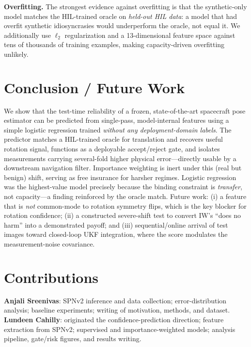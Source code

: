 \documentclass{article}
\begin{document}
\textbf{Overfitting.} The strongest evidence against overfitting is that the
synthetic-only model matches the HIL-trained oracle on \emph{held-out HIL data}: a
model that had overfit synthetic idiosyncrasies would underperform the oracle, not
equal it. We additionally use $\ell_2$ regularization and a 13-dimensional feature
space against tens of thousands of training examples, making capacity-driven
overfitting unlikely.

\section{Conclusion / Future Work}

We show that the test-time reliability of a frozen, state-of-the-art spacecraft pose
estimator can be predicted from single-pass, model-internal features using a simple
logistic regression trained \emph{without any deployment-domain labels}. The
predictor matches a HIL-trained oracle for translation and recovers useful rotation
signal, functions as a deployable accept/reject gate, and isolates measurements
carrying several-fold higher physical error---directly usable by a downstream
navigation filter. Importance weighting is inert under this (real but benign) shift,
serving as free insurance for harsher regimes. Logistic regression was the
highest-value model precisely because the binding constraint is \emph{transfer},
not capacity---a finding reinforced by the oracle match. Future work: (i) a feature
that is \emph{not} common-mode to rotation symmetry flips, which is the key blocker
for rotation confidence; (ii) a constructed severe-shift test to convert IW's
``does no harm'' into a demonstrated payoff; and (iii) sequential/online arrival of
test images toward closed-loop UKF integration, where the score modulates the
measurement-noise covariance.

\section*{Contributions}
\textbf{Anjali Sreenivas}: SPNv2 inference and data collection; error-distribution
analysis; baseline experiments; writing of motivation, methods, and dataset.
\textbf{Lundeen Cahilly}: originated the confidence-prediction direction; feature
extraction from SPNv2; supervised and importance-weighted models; analysis pipeline,
gate/risk figures, and results writing.



\end{document}
